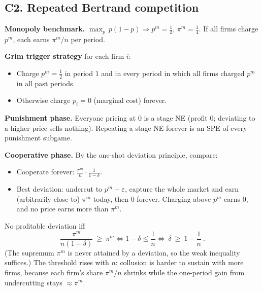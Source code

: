 \documentclass[11pt]{article}
\begin{document}
\subsection*{C2. Repeated Bertrand competition}
\textbf{Monopoly benchmark.} $\max_p\, p(1-p)\Rightarrow p^m=\tfrac12$, $\pi^m=\tfrac14$. If all firms charge $p^m$, each earns $\pi^m/n$ per period.

\textbf{Grim trigger strategy} for each firm $i$:
\begin{itemize}
  \item Charge $p^m=\tfrac12$ in period 1 and in every period in which all firms charged $p^m$ in all past periods.
  \item Otherwise charge $p_i=0$ (marginal cost) forever.
\end{itemize}

\textbf{Punishment phase.} Everyone pricing at $0$ is a stage NE (profit $0$; deviating to a higher price sells nothing). Repeating a stage NE forever is an SPE of every punishment subgame.

\textbf{Cooperative phase.} By the one-shot deviation principle, compare:
\begin{itemize}
  \item Cooperate forever: $\displaystyle \frac{\pi^m}{n}\cdot\frac{1}{1-\delta}$.
  \item Best deviation: undercut to $p^m-\varepsilon$, capture the whole market and earn (arbitrarily close to) $\pi^m$ today, then $0$ forever. Charging above $p^m$ earns $0$, and no price earns more than $\pi^m$.
\end{itemize}
No profitable deviation iff
\[
  \frac{\pi^m}{n(1-\delta)}\ \ge\ \pi^m
  \iff 1-\delta\le\frac1n
  \iff \boxed{\ \delta\ \ge\ 1-\frac1n\ }.
\]
(The supremum $\pi^m$ is never attained by a deviation, so the weak inequality suffices.) The threshold rises with $n$: collusion is harder to sustain with more firms, because each firm's share $\pi^m/n$ shrinks while the one-period gain from undercutting stays $\approx\pi^m$.
\end{document}
